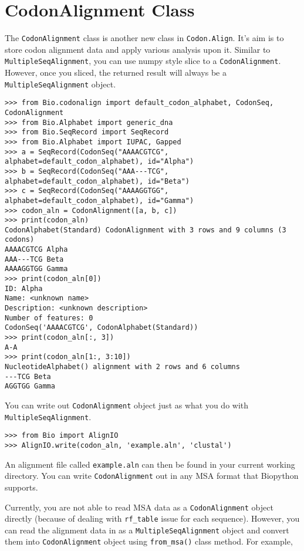 \section{CodonAlignment Class}

The \verb|CodonAlignment| class is another new class in
\verb|Codon.Align|. It's aim is to store codon alignment data and
apply various analysis upon it. Similar to
\verb|MultipleSeqAlignment|, you can use numpy style slice to a
\verb|CodonAlignment|. However, once you sliced, the returned result
will always be a \verb|MultipleSeqAlignment| object.

\begin{verbatim}
>>> from Bio.codonalign import default_codon_alphabet, CodonSeq, CodonAlignment
>>> from Bio.Alphabet import generic_dna
>>> from Bio.SeqRecord import SeqRecord
>>> from Bio.Alphabet import IUPAC, Gapped
>>> a = SeqRecord(CodonSeq("AAAACGTCG", alphabet=default_codon_alphabet), id="Alpha")
>>> b = SeqRecord(CodonSeq("AAA---TCG", alphabet=default_codon_alphabet), id="Beta")
>>> c = SeqRecord(CodonSeq("AAAAGGTGG", alphabet=default_codon_alphabet), id="Gamma")
>>> codon_aln = CodonAlignment([a, b, c])
>>> print(codon_aln)
CodonAlphabet(Standard) CodonAlignment with 3 rows and 9 columns (3 codons)
AAAACGTCG Alpha
AAA---TCG Beta
AAAAGGTGG Gamma
>>> print(codon_aln[0])
ID: Alpha
Name: <unknown name>
Description: <unknown description>
Number of features: 0
CodonSeq('AAAACGTCG', CodonAlphabet(Standard))
>>> print(codon_aln[:, 3])
A-A
>>> print(codon_aln[1:, 3:10])
NucleotideAlphabet() alignment with 2 rows and 6 columns
---TCG Beta
AGGTGG Gamma
\end{verbatim}

You can write out \verb|CodonAlignment| object just as what you do
with \verb|MultipleSeqAlignment|.

\begin{verbatim}
>>> from Bio import AlignIO
>>> AlignIO.write(codon_aln, 'example.aln', 'clustal')
\end{verbatim}

An alignment file called \texttt{example.aln} can then be found in your
current working directory. You can write \verb|CodonAlignment| out in
any MSA format that Biopython supports.

Currently, you are not able to read MSA data as a
\verb|CodonAlignment| object directly (because of dealing with
\texttt{rf\_table} issue for each sequence). However, you can read the
alignment data in as a \verb|MultipleSeqAlignment| object and convert
them into \verb|CodonAlignment| object using \verb|from_msa()|
class method. For example,

